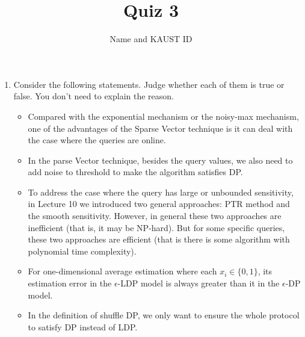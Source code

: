 \documentclass[11pt]{article}
\begin{document}
\author{Name and KAUST ID}
\title{Quiz 3}
\maketitle

\medskip

\begin{enumerate}

\item Consider the following statements. Judge whether each of them is true or false. You don’t need to explain the reason.
\begin{itemize}

\item Compared with the exponential mechanism or the noisy-max mechanism, one of the advantages of the Sparse Vector technique is it can deal with the case where the queries are online. 

\item In the parse Vector technique, besides the query values, we also need to add noise to threshold to make the algorithm satisfies DP. 

\item  To address the case where the query has large or unbounded sensitivity, in Lecture 10 we introduced two general approaches: PTR method and the smooth sensitivity. However, in general these two approaches are inefficient (that is, it may be NP-hard). But for some specific queries, these two approaches are efficient (that is there is some algorithm with polynomial time complexity). 
\item For one-dimensional average estimation where each $x_i\in \{0, 1\}$, its estimation error in the $\epsilon$-LDP model is always greater than it in the $\epsilon$-DP model. 
\item In the definition of shuffle DP, we only want to ensure the whole protocol to satisfy DP instead of LDP. 
\end{itemize}

\end{enumerate}
 
\end{document}
